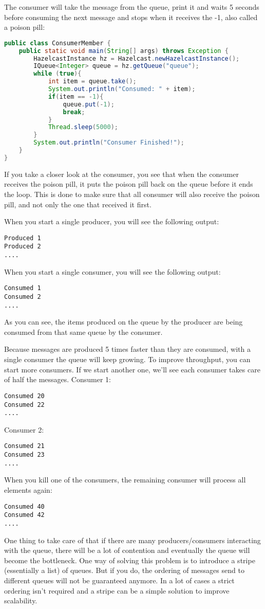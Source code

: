 The consumer will take the message from the queue, print it and waits 5 seconds before consuming the next message and stops when it receives the -1, also called a poison pill:
\begin{lstlisting}[language=java]
public class ConsumerMember {
    public static void main(String[] args) throws Exception {
        HazelcastInstance hz = Hazelcast.newHazelcastInstance();
        IQueue<Integer> queue = hz.getQueue("queue");
        while (true){
            int item = queue.take();
            System.out.println("Consumed: " + item);
            if(item == -1){
                queue.put(-1);
                break;
            }     
            Thread.sleep(5000);
        }
        System.out.println("Consumer Finished!");
    }
}
\end{lstlisting}
If you take a closer look at the consumer, you see that when the consumer receives the poison pill, it puts the poison pill back on the queue before it ends the loop. This is done to make sure that all consumer will also receive the poison pill, and not only the one that received it first.

When you start a single producer, you will see the following output:
\begin{lstlisting}
Produced 1
Produced 2
....
\end{lstlisting}
When you start a single consumer, you will see the following output:
\begin{lstlisting}
Consumed 1
Consumed 2
....
\end{lstlisting}
As you can see, the items produced on the queue by the producer are being consumed from that same queue by the consumer. 

Because messages are produced 5 times faster than they are consumed, with a single consumer the queue will keep growing. To improve throughput, you can start more consumers. If we start another one, we'll see each consumer takes care of half the messages. Consumer 1:
\begin{lstlisting}
Consumed 20
Consumed 22
....
\end{lstlisting}
Consumer 2:
\begin{lstlisting}
Consumed 21
Consumed 23
....
\end{lstlisting}
When you kill one of the consumers, the remaining consumer will process all elements again:
\begin{lstlisting}
Consumed 40  
Consumed 42 
....
\end{lstlisting}
One thing to take care of that if there are many producers/consumers interacting with the queue, there will be a lot of contention and eventually the queue will become the bottleneck. One way of solving this problem is to introduce a stripe (essentially a list) of queues. But if you do, the ordering of messages send to different queues will not be guaranteed anymore. In a lot of cases a strict ordering isn't required and a stripe can be a simple solution to improve scalability.

